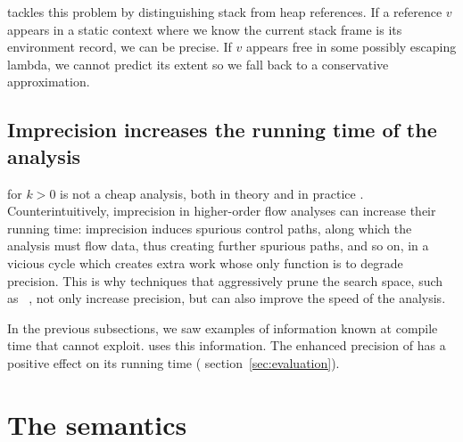 \documentclass{LMCS}
\theoremstyle{definition} \newtheorem{property}[thm]{Property}
\begin{document}
\cfat{} tackles this problem by distinguishing stack from heap references.
If a reference $v$ appears in a static context where we know the current stack 
frame is its environment record, we can be precise.
If $v$ appears free in some possibly escaping lambda, we cannot predict its
extent so we fall back to a conservative approximation.

\subsection{Imprecision increases the running time of the analysis}

\kcfa{} for $k > 0$ is not a cheap analysis, both in theory
\cite{conf/icfp/08/vanhorn/kcfa} and in practice
\cite{conf/pldi/88/shivers/cfaretro}.
Counterintuitively, imprecision in higher-order flow analyses can increase 
their running time: imprecision induces spurious control paths, along which the
analysis must flow data, thus creating further spurious paths, and so on, in a 
vicious cycle which creates extra work whose only function is to degrade 
pre\-ci\-sion.
This is why techniques that aggressively prune the search space, such as 
\cfa{\Gamma}~\cite{conf/icfp/06/might/gcfa}, not only increase precision, but 
can also improve the speed of the analysis.

In the previous subsections, we saw examples of information known at compile 
time that \kcfa{} cannot exploit.
\cfat{} uses this information. 
The enhanced precision of \cfat{} has a positive effect on its running
time (\confer{} section~\ref{sec:evaluation}).


\section{The {\cfat} semantics\label{sec:cfa2sems}}
\end{document}
